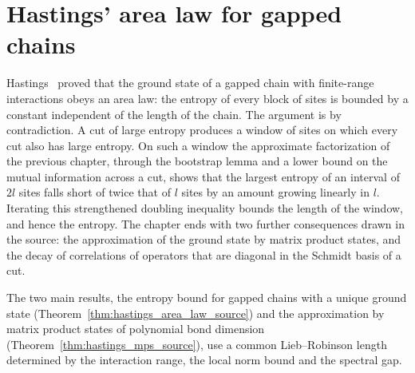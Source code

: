 \chapter{Hastings' area law for gapped chains}
\label{ch:hastings_window}

Hastings~\cite{Hastings2007AreaLaw} proved that the ground state of a gapped
chain with finite-range interactions obeys an area law: the entropy of every
block of sites is bounded by a constant independent of the length of the
chain. The argument is by contradiction. A cut of large entropy produces a
window of sites on which every cut also has large entropy. On such a window
the approximate factorization of the previous chapter, through the bootstrap
lemma and a lower bound on the mutual information across a cut, shows that
the largest entropy of an interval of $2l$ sites falls short of twice that of
$l$ sites by an amount growing linearly in $l$. Iterating this strengthened
doubling inequality bounds the length of the window, and hence the entropy.
The chapter ends with two further consequences drawn in the source: the
approximation of the ground state by matrix product states, and the decay of
correlations of operators that are diagonal in the Schmidt basis of a cut.

The two main results, the entropy bound for gapped chains with a unique
ground state (Theorem~\ref{thm:hastings_area_law_source}) and the
approximation by matrix product states of polynomial bond dimension
(Theorem~\ref{thm:hastings_mps_source}), use a common Lieb--Robinson length
determined by the interaction range, the local norm bound and the spectral
gap.











